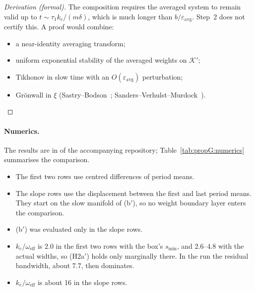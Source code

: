 \begin{proof}[Derivation (formal)]
The composition requires the averaged system to remain valid up to $t\sim\tau_1k_e/(m\delta)$, which is much longer
than $b/\varepsilon_{\mathrm{avg}}$. Step~2 does not certify this. A proof would combine:
\begin{itemize}
  \item a near-identity averaging transform;
  \item uniform exponential stability of the averaged weights on $\mathcal{K}'$;
  \item Tikhonov in slow time with an $O(\varepsilon_{\mathrm{avg}})$ perturbation;
  \item Grönwall in $\xi$ (Sastry--Bodson~\cite[\S4.4]{sb1989}; Sanders--Verhulst--Murdock~\cite[Ch.~5]{svm2007}).
\end{itemize}
\end{proof}

\paragraph{Numerics.} The results are in  of the accompanying repository;
Table~\ref{tab:propG:numerics} summarises the comparison.
\begin{itemize}
  \item The first two rows use centred differences of period means.
  \item The slope rows use the displacement between the first and last period means. They start on the slow manifold
    of (b$'$), so no weight boundary layer enters the comparison.
  \item (b$'$) was evaluated only in the slope rows.
  \item $k_e/\omega_{\mathrm{eff}}$ is 2.0 in the first two rows with the box's $s_{\min}$, and 2.6--4.8 with the
    actual widths, so (H2a$'$) holds only marginally there. In the  run the residual bandwidth, about
    7.7, then dominates.
  \item $k_e/\omega_{\mathrm{eff}}$ is about 16 in the slope rows.
\end{itemize}

